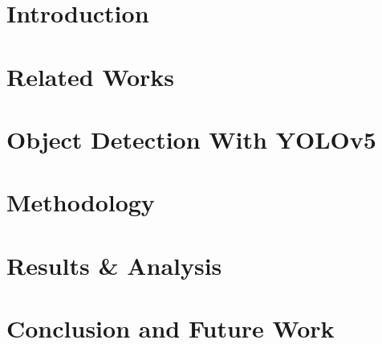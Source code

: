 \documentclass[12pt,a4paper]{report}
\begin{document}






\newpage
{}


\newpage
{}



\tableofcontents
\listoffigures
\listoftables

\newpage

\chapter{Introduction}



\newpage

\chapter{Related Works}


\newpage

\chapter{ Object Detection With YOLOv5}




\newpage

\chapter{Methodology}



\newpage

\chapter{ Results \& Analysis}


\newpage

\chapter{Conclusion and Future Work}


\printbibliography[heading=bibintoc, title={Bibliography}]
\end{document}
